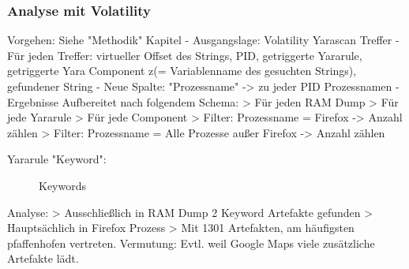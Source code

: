 \subsubsection*{Analyse mit Volatility}
Vorgehen: Siehe "Methodik" Kapitel
	- Ausgangslage: Volatility Yarascan Treffer
	- Für jeden Treffer: virtueller Offset des Strings, PID, getriggerte Yararule, getriggerte Yara Component z(= Variablenname des gesuchten Strings), gefundener String
	- Neue Spalte: "Prozessname" -> zu jeder PID Prozessnamen
	- Ergebnisse Aufbereitet nach folgendem Schema:
		> Für jeden RAM Dump
		> Für jede Yararule
		> Für jede Component
		> Filter: Prozessname = Firefox -> Anzahl zählen
		> Filter: Prozessname = Alle Prozesse außer Firefox -> Anzahl zählen

Yararule "Keyword":
	\begin{figure}[h!]
		\centerline{}
		\label{chart:final-criteria}  
		\caption{Keywords}
	\end{figure}
	Analyse:
		> Ausschließlich in RAM Dump 2 Keyword Artefakte gefunden
		> Hauptsächlich in Firefox Prozess
		> Mit 1301 Artefakten, am häufigsten pfaffenhofen vertreten. Vermutung: Evtl. weil Google Maps viele zusätzliche Artefakte lädt. 
		
